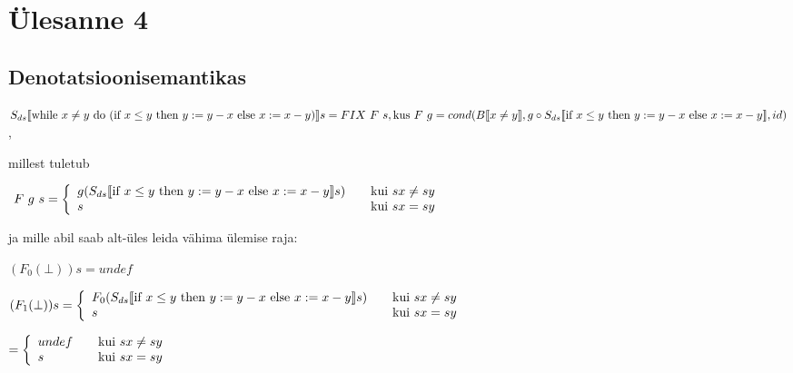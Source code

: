 \section{Ülesanne 4}
\subsection{Denotatsioonisemantikas}

\footnotesize
\(
S_{ds} \llbracket
\text{while\ } x \neq y \text{\ do\ }
  (\text{if\ } x \leq y
  \text{\ then\ } y := y - x \text{\ else\ } x := x - y )
\rrbracket s
= FIX \ F \ s,
\\
\text{kus} \ F \  g = cond(B \llbracket x \neq y \rrbracket, 
g \circ S_{ds} \llbracket \text{if\ } x \leq y \text{\ then\ } y := y - x
\text{\ else\ } x := x - y \rrbracket,
id
)
\),

millest tuletub 

\(
  \ F \  g \ s = \left\{
  \begin{array}{l l}
    g(
      S_{ds} \llbracket
        \text{if\ } x \leq y
        \text{\ then\ } y := y - x \text{\ else\ } x := x - y
      \rrbracket s
    ) & \quad \text{kui}\ sx \neq sy \\
    s   & \quad \text{kui}\ sx = sy\\
  \end{array} \right.
\)

ja mille abil saab alt-üles leida vähima ülemise raja:


\(
(F_0 (\bot)) s = undef
\)


\(
(F_1(\bot)) s = \left\{
  \begin{array}{l l}
    F_0(
      S_{ds} \llbracket
        \text{if\ } x \leq y
        \text{\ then\ } y := y - x \text{\ else\ } x := x - y
      \rrbracket s
    ) & \quad \text{kui}\ sx \neq sy \\
    s   & \quad \text{kui}\ sx = sy\\
  \end{array} \right.
\)

\(
= \left\{
  \begin{array}{l l}
    undef & \quad \text{kui}\ sx \neq sy \\
    s   & \quad \text{kui}\ sx = sy\\
  \end{array} \right.
\)


